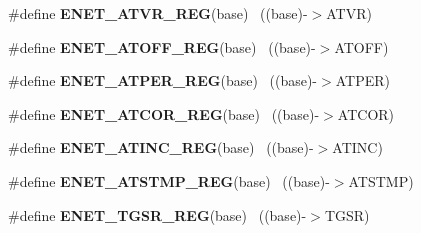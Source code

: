 \begin{DoxyCompactItemize}
\item 
\hypertarget{group___e_n_e_t___register___accessor___macros_ga2f65b96f955b07854a578d173fe7e576}{}\#define {\bfseries E\+N\+E\+T\+\_\+\+A\+T\+V\+R\+\_\+\+R\+E\+G}(base)                                        ~((base)-\/$>$A\+T\+V\+R)\label{group___e_n_e_t___register___accessor___macros_ga2f65b96f955b07854a578d173fe7e576}

\item 
\hypertarget{group___e_n_e_t___register___accessor___macros_ga11c2d0e1a681813590b6e8d35eb1e9f4}{}\#define {\bfseries E\+N\+E\+T\+\_\+\+A\+T\+O\+F\+F\+\_\+\+R\+E\+G}(base)                                      ~((base)-\/$>$A\+T\+O\+F\+F)\label{group___e_n_e_t___register___accessor___macros_ga11c2d0e1a681813590b6e8d35eb1e9f4}

\item 
\hypertarget{group___e_n_e_t___register___accessor___macros_gaf3e6ee64490f60cf6f577206674720a7}{}\#define {\bfseries E\+N\+E\+T\+\_\+\+A\+T\+P\+E\+R\+\_\+\+R\+E\+G}(base)                                      ~((base)-\/$>$A\+T\+P\+E\+R)\label{group___e_n_e_t___register___accessor___macros_gaf3e6ee64490f60cf6f577206674720a7}

\item 
\hypertarget{group___e_n_e_t___register___accessor___macros_ga69df123e47d505cd8e48b2230dadf2d6}{}\#define {\bfseries E\+N\+E\+T\+\_\+\+A\+T\+C\+O\+R\+\_\+\+R\+E\+G}(base)                                      ~((base)-\/$>$A\+T\+C\+O\+R)\label{group___e_n_e_t___register___accessor___macros_ga69df123e47d505cd8e48b2230dadf2d6}

\item 
\hypertarget{group___e_n_e_t___register___accessor___macros_ga685cba955cb986468e4903088597749c}{}\#define {\bfseries E\+N\+E\+T\+\_\+\+A\+T\+I\+N\+C\+\_\+\+R\+E\+G}(base)                                      ~((base)-\/$>$A\+T\+I\+N\+C)\label{group___e_n_e_t___register___accessor___macros_ga685cba955cb986468e4903088597749c}

\item 
\hypertarget{group___e_n_e_t___register___accessor___macros_ga529b955072688c6b7ca5ca5211691a5d}{}\#define {\bfseries E\+N\+E\+T\+\_\+\+A\+T\+S\+T\+M\+P\+\_\+\+R\+E\+G}(base)                                    ~((base)-\/$>$A\+T\+S\+T\+M\+P)\label{group___e_n_e_t___register___accessor___macros_ga529b955072688c6b7ca5ca5211691a5d}

\item 
\hypertarget{group___e_n_e_t___register___accessor___macros_ga8c36de0ac77d406089ee607a14d3a72c}{}\#define {\bfseries E\+N\+E\+T\+\_\+\+T\+G\+S\+R\+\_\+\+R\+E\+G}(base)                                        ~((base)-\/$>$T\+G\+S\+R)\label{group___e_n_e_t___register___accessor___macros_ga8c36de0ac77d406089ee607a14d3a72c}


\end{DoxyCompactItemize}
